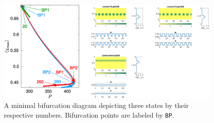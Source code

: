 \documentclass[a4paper,12pt]{article}
\begin{document}
\begin{figure}
    \centering
    \includegraphics[width=1\linewidth]{min_bif.eps}
    \caption{A minimal bifurcation diagram depicting three states by their respective numbers. Bifurcation points are labeled by {\tt BP}.}
    \label{fig:min_bif}
\end{figure}
\end{document}
